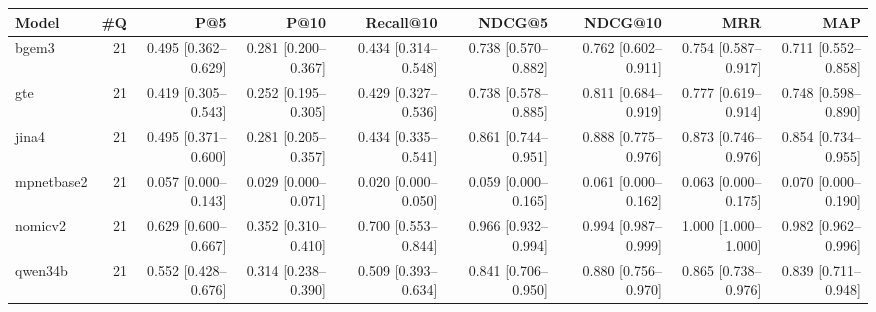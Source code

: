 \begin{tabular}{lrrrrrrrr}
\toprule
Model & \#Q & P@5 & P@10 & Recall@10 & NDCG@5 & NDCG@10 & MRR & MAP \\
\midrule
bgem3 & 21 & 0.495 [0.362–0.629] & 0.281 [0.200–0.367] & 0.434 [0.314–0.548] & 0.738 [0.570–0.882] & 0.762 [0.602–0.911] & 0.754 [0.587–0.917] & 0.711 [0.552–0.858] \\
gte & 21 & 0.419 [0.305–0.543] & 0.252 [0.195–0.305] & 0.429 [0.327–0.536] & 0.738 [0.578–0.885] & 0.811 [0.684–0.919] & 0.777 [0.619–0.914] & 0.748 [0.598–0.890] \\
jina4 & 21 & 0.495 [0.371–0.600] & 0.281 [0.205–0.357] & 0.434 [0.335–0.541] & 0.861 [0.744–0.951] & 0.888 [0.775–0.976] & 0.873 [0.746–0.976] & 0.854 [0.734–0.955] \\
mpnetbase2 & 21 & 0.057 [0.000–0.143] & 0.029 [0.000–0.071] & 0.020 [0.000–0.050] & 0.059 [0.000–0.165] & 0.061 [0.000–0.162] & 0.063 [0.000–0.175] & 0.070 [0.000–0.190] \\
nomicv2 & 21 & 0.629 [0.600–0.667] & 0.352 [0.310–0.410] & 0.700 [0.553–0.844] & 0.966 [0.932–0.994] & 0.994 [0.987–0.999] & 1.000 [1.000–1.000] & 0.982 [0.962–0.996] \\
qwen34b & 21 & 0.552 [0.428–0.676] & 0.314 [0.238–0.390] & 0.509 [0.393–0.634] & 0.841 [0.706–0.950] & 0.880 [0.756–0.970] & 0.865 [0.738–0.976] & 0.839 [0.711–0.948] \\
\bottomrule
\end{tabular}
